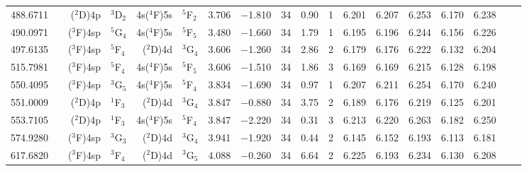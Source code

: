 \documentclass[traditabstract]{aa}
\newcommand{\pst}{\phantom{*}}
\begin{document}
\begin{center}
\begin{mpsupertabular}{r@{}c@{\ \ \ }r@{~}l@{\ }r@{~}l@{\ \ \ }c@{\ \ \ }c@{\ \ \ }c@{\ \ \ }c@{\ \ \ }c@{\ \ \ }c@{\ \ \ }c@{\ \ \ }c@{\ \ \ }c@{\ \ \ }c@{\ \ \ }r@{\ \ \ }c}
488.6711 & &\footnotesize($^2$D)4p   &\footnotesize$^3$D$_2$             &\footnotesize4s($^4$F)5s&\footnotesize$^5$F$_2$             & 3.706 & $-$1.810 & 34 & 0.90 & 1\pst      & 6.201 & 6.207 & 6.253 & 6.170 & 6.238 &             &   \\   
490.0971 & &\footnotesize($^3$F)4sp  &\footnotesize$^5$G$_4$             &\footnotesize4s($^4$F)5s&\footnotesize$^5$F$_5$             & 3.480 & $-$1.660 & 34 & 1.79 & 1\pst      & 6.195 & 6.196 & 6.244 & 6.156 & 6.226 &             &   \\   
497.6135 & \color{BrickRed}{$^c$}	  	          	
           &\footnotesize($^3$F)4sp  &\footnotesize$^5$F$_4$             &\footnotesize($^2$D)4d  &\footnotesize$^3$G$_4$             & 3.606 & $-$1.260 & 34 & 2.86 & 2\pst      & 6.179 & 6.176 & 6.222 & 6.132 & 6.204 &             &   \\   
515.7981 & &\footnotesize($^3$F)4sp  &\footnotesize$^5$F$_4$             &\footnotesize4s($^4$F)5s&\footnotesize$^5$F$_5$             & 3.606 & $-$1.510 & 34 & 1.86 & 3\pst      & 6.169 & 6.169 & 6.215 & 6.128 & 6.198 &             &   \\   
550.4095 & &\footnotesize($^3$F)4sp  &\footnotesize$^3$G$_5$             &\footnotesize4s($^4$F)5s&\footnotesize$^5$F$_4$             & 3.834 & $-$1.690 & 34 & 0.97 & 1\pst      & 6.207 & 6.211 & 6.254 & 6.170 & 6.240 &             &   \\   
551.0009 & \color{BrickRed}{$^c$}	  	          	
           &\footnotesize($^2$D)4p   &\footnotesize$^1$F$_3$             &\footnotesize($^2$D)4d  &\footnotesize$^3$G$_4$             & 3.847 & $-$0.880 & 34 & 3.75 & 2\pst      & 6.189 & 6.176 & 6.219 & 6.125 & 6.201 &             &   \\   
553.7105 & &\footnotesize($^2$D)4p   &\footnotesize$^1$F$_3$             &\footnotesize4s($^4$F)5s&\footnotesize$^5$F$_4$             & 3.847 & $-$2.220 & 34 & 0.31 & 3\pst      & 6.213 & 6.220 & 6.263 & 6.182 & 6.250 &             &   \\   
574.9280 & \color{BrickRed}{$^c$}	  	          	
           &\footnotesize($^3$F)4sp  &\footnotesize$^3$G$_3$             &\footnotesize($^2$D)4d  &\footnotesize$^3$G$_4$             & 3.941 & $-$1.920 & 34 & 0.44 & 2\pst      & 6.145 & 6.152 & 6.193 & 6.113 & 6.181 &             &   \\   
617.6820 & \color{BrickRed}{$^c$}					    		  	          	
           &\footnotesize($^3$F)4sp  &\footnotesize$^3$F$_4$             &\footnotesize($^2$D)4d  &\footnotesize$^3$G$_5$             & 4.088 & $-$0.260 & 34 & 6.64 & 2\pst      & 6.225 & 6.193 & 6.234 & 6.130 & 6.208 &             &   \\   

\end{mpsupertabular}
\end{center}
\end{document}
